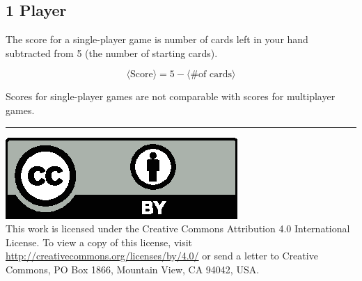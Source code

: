 \documentclass{article}
\begin{document}
\subsection{1 Player}

The score for a single-player game is number of cards left in your hand subtracted from 5 (the number of starting cards).

$$
\langle\textrm{Score}\rangle = 5 - \langle\textrm{\# of cards}\rangle
$$

Scores for single-player games are not comparable with scores for multiplayer games.

\medskip
\hrule

{
  \small
  \includegraphics[scale=0.5]{cc-by.eps}\\
  This work is licensed under the Creative Commons Attribution 4.0
  International License. To view a copy of this license, visit
  \url{http://creativecommons.org/licenses/by/4.0/} or send a letter to Creative Commons, PO Box 1866, Mountain View, CA 94042, USA.
}
\end{document}

